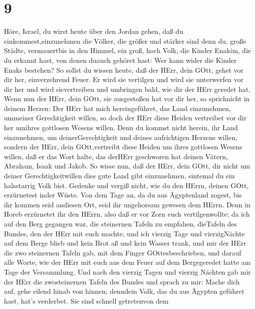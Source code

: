 \hypertarget{section-8}{%
\section{9}\label{section-8}}

 Höre, Israel, du wirst heute über den Jordan gehen, daß du
einkommest,einzunehmen die Völker, die größer und stärker sind denn du,
große Städte, vermauertbis in den Himmel,  ein groß, hoch
Volk, die Kinder Enakim, die du erkannt hast, von denen duauch gehöret
hast: Wer kann wider die Kinder Enaks bestehen?  So sollst
du wissen heute, daß der HErr, dein GOtt, gehet vor dir her,
einverzehrend Feuer. Er wird sie vertilgen und wird sie unterwerfen vor
dir her und wird sievertreiben und umbringen bald, wie dir der HErr
geredet hat.  Wenn nun der HErr, dein GOtt, sie ausgestoßen
hat vor dir her, so sprichnicht in deinem Herzen: Der HErr hat mich
hereingeführet, das Land einzunehmen, ummeiner Gerechtigkeit willen, so
doch der HErr diese Heiden vertreibet vor dir her umihres gottlosen
Wesens willen.  Denn du kommst nicht herein, ihr Land
einzunehmen, um deinerGerechtigkeit und deines aufrichtigen Herzens
willen, sondern der HErr, dein GOtt,vertreibt diese Heiden um ihres
gottlosen Wesens willen, daß er das Wort halte, das derHErr geschworen
hat deinen Vätern, Abraham, Isaak und Jakob.  So wisse nun,
daß der HErr, dein GOtt, dir nicht um deiner Gerechtigkeitwillen dies
gute Land gibt einzunehmen, sintemal du ein halsstarrig Volk bist.
 Gedenke und vergiß nicht, wie du den HErrn, deinen GOtt,
erzürnetest inder Wüste. Von dem Tage an, da du aus Ägyptenland zogest,
bis ihr kommen seid andiesen Ort, seid ihr ungehorsam gewesen dem HErrn.
 Denn in Horeb erzürnetet ihr den HErrn, also daß er vor
Zorn euch vertilgenwollte;  da ich auf den Berg gegangen
war, die steinernen Tafeln zu empfahen, dieTafeln des Bundes, den der
HErr mit euch machte, und ich vierzig Tage und vierzigNächte auf dem
Berge blieb und kein Brot aß und kein Wasser trank,  und
mir der HErr die zwo steinernen Tafeln gab, mit dem Finger
GOttesbeschrieben, und darauf alle Worte, wie der HErr mit euch aus dem
Feuer auf dem Bergegeredet hatte am Tage der Versammlung. 
Und nach den vierzig Tagen und vierzig Nächten gab mir der HErr die
zwosteinernen Tafeln des Bundes  und sprach zu mir: Mache
dich auf, gehe eilend hinab von hinnen; denndein Volk, das du aus
Ägypten geführet hast, hat's verderbet. Sie sind schnell getretenvon dem

